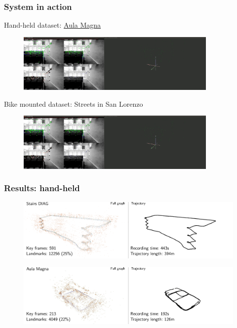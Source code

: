 \documentclass[11pt]{beamer}
\begin{document}
\begin{frame}
\frametitle{System in action}
Hand-held dataset: \href{run:/home/n551jw/Documents/presentation_ma/aula_magna.ogv}{Aula Magna}
\begin{figure}[!htb]
\centering
\includegraphics[width=0.87\textwidth]{figures/movie_aula_magna.png}
\end{figure}
Bike mounted dataset: Streets in San Lorenzo
\begin{figure}[!htb]
\centering
\includegraphics[width=0.87\textwidth]{figures/movie_aula_magna.png}
\end{figure}
\end{frame}

\begin{frame}
\frametitle{Results: hand-held}
\begin{figure}[!htb]
\centering
\includegraphics[width=\textwidth]{figures/results/stairs_combined.pdf}
\end{figure}
\begin{figure}[!htb]
\centering
\includegraphics[width=\textwidth]{figures/results/aula_magna.pdf}
\end{figure}
\end{frame}
\end{document}
